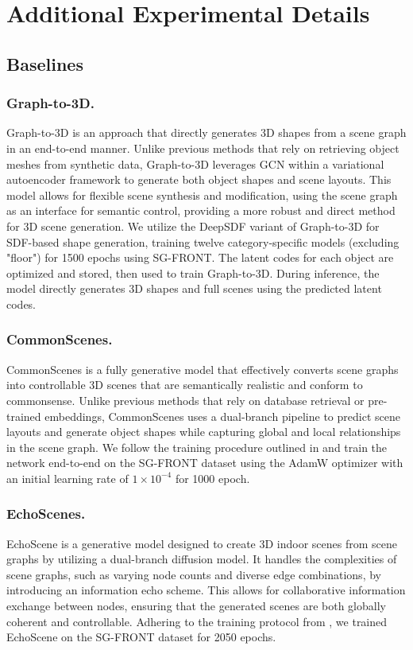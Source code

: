 \section{Additional Experimental Details}
\label{sec:Additional Experimental Details}

\subsection{Baselines}

\subsubsection{Graph-to-3D.}
Graph-to-3D \cite{dhamo2021graph}is an approach that directly generates 3D shapes from a scene graph in an end-to-end manner. Unlike previous methods that rely on retrieving object meshes from synthetic data, Graph-to-3D leverages GCN within a variational autoencoder framework to generate both object shapes and scene layouts. This model allows for flexible scene synthesis and modification, using the scene graph as an interface for semantic control, providing a more robust and direct method for 3D scene generation.
We utilize the DeepSDF \cite{park2019deepsdf} variant of Graph-to-3D for SDF-based shape generation, training twelve category-specific models (excluding "floor") for 1500 epochs using SG-FRONT. The latent codes for each object are optimized and stored, then used to train Graph-to-3D. During inference, the model directly generates 3D shapes and full scenes using the predicted latent codes.

\subsubsection{CommonScenes.}
CommonScenes \cite{zhai2024commonscenes} is a fully generative model that effectively converts scene graphs into controllable 3D scenes that are semantically realistic and conform to commonsense. Unlike previous methods that rely on database retrieval or pre-trained embeddings, CommonScenes uses a dual-branch pipeline to predict scene layouts and generate object shapes while capturing global and local relationships in the scene graph. 
We follow the training procedure outlined in \cite{zhai2024commonscenes} and train the network end-to-end on the SG-FRONT dataset using the AdamW optimizer with an initial learning rate of $1 \times 10^{-4}$ for 1000 epoch.

\subsubsection{EchoScenes.}
EchoScene \cite{zhai2024echoscene} is a generative model designed to create 3D indoor scenes from scene graphs by utilizing a dual-branch diffusion model. It handles the complexities of scene graphs, such as varying node counts and diverse edge combinations, by introducing an information echo scheme. This allows for collaborative information exchange between nodes, ensuring that the generated scenes are both globally coherent and controllable.
Adhering to the training protocol from \cite{zhai2024echoscene}, we trained EchoScene on the SG-FRONT dataset for 2050 epochs.



